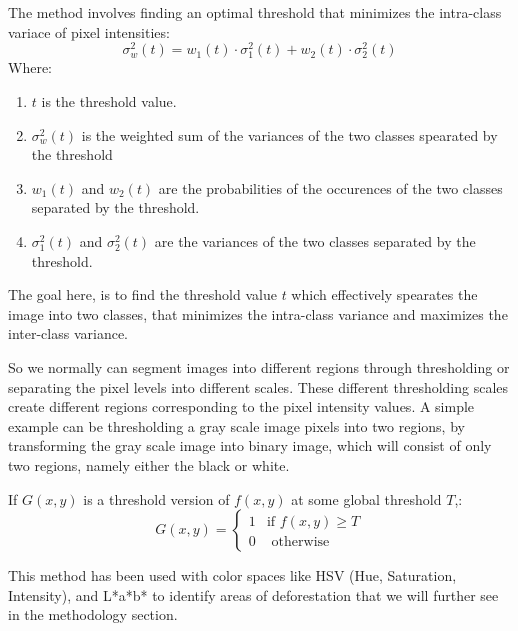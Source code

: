 \documentclass[12pt,a4paper,IEEEtran]{article}
\begin{document}
The method involves finding an optimal threshold that minimizes the intra-class variace of pixel intensities:
\begin{equation}
	\sigma^2_w(t) = w_1(t) \cdot \sigma_1^2(t) + w_2(t) \cdot \sigma_2^2(t)
\end{equation}
Where: 
\begin{enumerate}
	\item $t$ is the threshold value.
	\item $\sigma^2_w(t)$ is the weighted sum of the variances of the two classes spearated by the threshold
	\item $w_1(t)$ and $w_2(t)$ are the probabilities of the occurences of the two classes separated by the threshold.
	\item $\sigma_1^2(t)$ and $\sigma_2^2(t)$ are the variances of the two classes separated by the threshold.
\end{enumerate}
The goal here, is to find the threshold value $t$ which effectively spearates the image into two classes, that minimizes the intra-class variance and maximizes the inter-class variance. \cite{5254345}

So we normally can segment images into different regions through thresholding or separating the pixel levels into different scales. These different thresholding scales create different regions corresponding to the pixel intensity values. 
\newline A simple example can be thresholding a gray scale image pixels into two regions, by transforming the gray scale image into binary image, which will consist of only two regions, namely either the black or white.

If $G(x,y)$ is a threshold version of $f(x,y)$ at some global threshold $T$,:
\[G(x,y) =
\begin{cases}
1 & \text{if } f(x,y) \geq T\\
0 & \text{ otherwise}
\end{cases}
\]

This method has been used with color spaces like HSV (Hue, Saturation, Intensity), and L*a*b* to identify areas of deforestation that we will further see in the methodology section.



\end{document}
